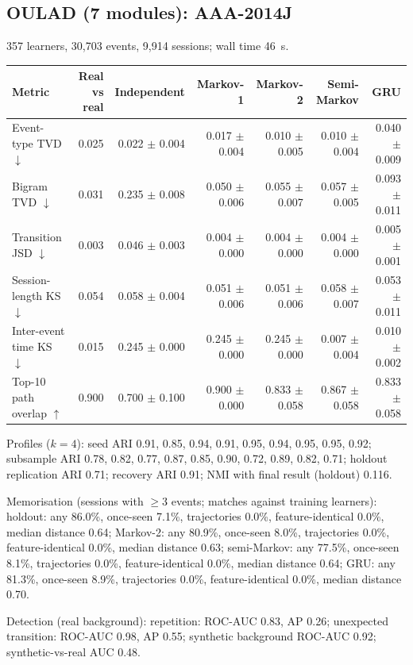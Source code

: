 \subsection*{OULAD (7 modules): AAA-2014J}
357 learners, 30{,}703 events, 9{,}914 sessions; wall time 46~s.

\begin{tabular}{l r r r r r r }
\toprule
Metric & Real vs real & Independent & Markov-1 & Markov-2 & Semi-Markov & GRU \\
\midrule
Event-type TVD $\downarrow$ & 0.025 & 0.022 $\pm$ 0.004 & 0.017 $\pm$ 0.004 & 0.010 $\pm$ 0.005 & 0.010 $\pm$ 0.004 & 0.040 $\pm$ 0.009 \\
Bigram TVD $\downarrow$ & 0.031 & 0.235 $\pm$ 0.008 & 0.050 $\pm$ 0.006 & 0.055 $\pm$ 0.007 & 0.057 $\pm$ 0.005 & 0.093 $\pm$ 0.011 \\
Transition JSD $\downarrow$ & 0.003 & 0.046 $\pm$ 0.003 & 0.004 $\pm$ 0.000 & 0.004 $\pm$ 0.000 & 0.004 $\pm$ 0.000 & 0.005 $\pm$ 0.001 \\
Session-length KS $\downarrow$ & 0.054 & 0.058 $\pm$ 0.004 & 0.051 $\pm$ 0.006 & 0.051 $\pm$ 0.006 & 0.058 $\pm$ 0.007 & 0.053 $\pm$ 0.011 \\
Inter-event time KS $\downarrow$ & 0.015 & 0.245 $\pm$ 0.000 & 0.245 $\pm$ 0.000 & 0.245 $\pm$ 0.000 & 0.007 $\pm$ 0.004 & 0.010 $\pm$ 0.002 \\
Top-10 path overlap $\uparrow$ & 0.900 & 0.700 $\pm$ 0.100 & 0.900 $\pm$ 0.000 & 0.833 $\pm$ 0.058 & 0.867 $\pm$ 0.058 & 0.833 $\pm$ 0.058 \\
\bottomrule
\end{tabular}

Profiles ($k=4$): seed ARI 0.91, 0.85, 0.94, 0.91, 0.95, 0.94, 0.95, 0.95, 0.92; subsample ARI 0.78, 0.82, 0.77, 0.87, 0.85, 0.90, 0.72, 0.89, 0.82, 0.71; holdout replication ARI 0.71; recovery ARI 0.91; NMI with final result (holdout) 0.116.

Memorisation (sessions with $\geq$3 events; matches against training learners): holdout: any 86.0\%, once-seen 7.1\%, trajectories 0.0\%, feature-identical 0.0\%, median distance 0.64; Markov-2: any 80.9\%, once-seen 8.0\%, trajectories 0.0\%, feature-identical 0.0\%, median distance 0.63; semi-Markov: any 77.5\%, once-seen 8.1\%, trajectories 0.0\%, feature-identical 0.0\%, median distance 0.64; GRU: any 81.3\%, once-seen 8.9\%, trajectories 0.0\%, feature-identical 0.0\%, median distance 0.70.

Detection (real background): repetition: ROC-AUC 0.83, AP 0.26; unexpected transition: ROC-AUC 0.98, AP 0.55; synthetic background ROC-AUC 0.92; synthetic-vs-real AUC 0.48.

